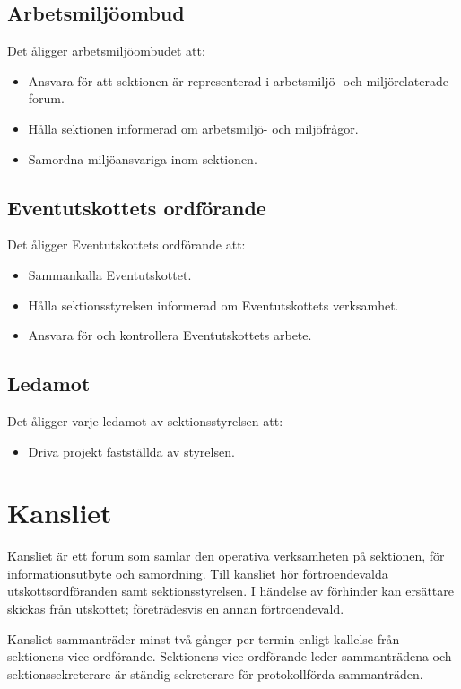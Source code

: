 \documentclass{datateknologsektionen-document}
\begin{document}
\subsection{Arbetsmiljöombud}
\label{amo}
Det åligger arbetsmiljöombudet att:
\begin{itemize}
  \item Ansvara för att sektionen är representerad i arbetsmiljö- och miljörelaterade forum.
  \item Hålla sektionen informerad om arbetsmiljö- och miljöfrågor.
  \item Samordna miljöansvariga inom sektionen.
\end{itemize}

\subsection{Eventutskottets ordförande}
\label{aktivitetshanterare}
Det åligger Eventutskottets ordförande att:
\begin{itemize}
  \item Sammankalla Eventutskottet.
  \item Hålla sektionsstyrelsen informerad om Eventutskottets verksamhet.
  \item Ansvara för och kontrollera Eventutskottets arbete.
  
\end{itemize}

\subsection{Ledamot}
\label{ledamot}
Det åligger varje ledamot av sektionsstyrelsen att:
\begin{itemize}
  \item Driva projekt fastställda av styrelsen.
\end{itemize}

\section{Kansliet}
Kansliet är ett forum som samlar den operativa verksamheten på sektionen, för
informationsutbyte och samordning. Till kansliet hör förtroendevalda utskottsordföranden
samt sektionsstyrelsen. I händelse av förhinder kan ersättare skickas från utskottet;
företrädesvis en annan förtroendevald.

Kansliet sammanträder minst två gånger per termin enligt kallelse från sektionens
vice ordförande. Sektionens vice ordförande leder sammanträdena och sektionssekreterare
är ständig sekreterare för protokollförda sammanträden.
\end{document}
